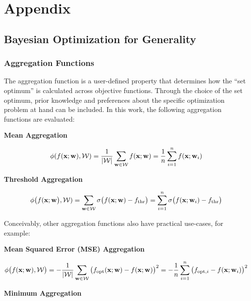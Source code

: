 \appendix
\onecolumn

\section{Appendix}

\subsection{Bayesian Optimization for Generality}

\subsubsection{Aggregation Functions} \label{subsubsec: Aggregation_functions}

The aggregation function is a user-defined property that determines how the ``set optimum'' is calculated across objective functions. 
Through the choice of the set optimum, prior knowledge and preferences about the specific optimization problem at hand can be included. 
In this work, the following aggregation functions are evaluated:

\textbf{Mean Aggregation}

\begin{equation}
\phi(f({\mathbf{x}}; {\mathbf{w}}), \mathcal{W}) = \frac{1}{|\mathcal{W}|} \sum_{{\mathbf{w}} \in \mathcal{W}} f({\mathbf{x}}; {\mathbf{w}}) = \frac{1}{n} \sum_{i=1}^{n}f({\mathbf{x}}; {\mathbf{w}}_i)
\end{equation}

\textbf{Threshold Aggregation}

\begin{equation}
\phi\big(f({\mathbf{x}}; {\mathbf{w}}\big), \mathcal{W}) = \sum_{{\mathbf{w}} \in \mathcal{W}} \sigma\big(f({\mathbf{x}}; {\mathbf{w}}) - f_{\mathrm{thr}}\big) = \sum_{i=1}^{n} \sigma\big(f({\mathbf{x}}; {\mathbf{w}}_i) - f_{\mathrm{thr}}\big)
\end{equation}

Conceivably, other aggregation functions also have practical use-cases, for example:

\textbf{Mean Squared Error (MSE) Aggregation}

\begin{equation}
\phi\big(f({\mathbf{x}}; {\mathbf{w}}), \mathcal{W}\big)  = - \frac{1}{|\mathcal{W}|} \sum_{{\mathbf{w}} \in \mathcal{W}} \big(f_{\mathrm{opt}}({\mathbf{x}}; {\mathbf{w}}) - f({\mathbf{x}}; {\mathbf{w}})\big)^2 = - \frac{1}{n} \sum_{i=1}^n \big(f_{\mathrm{opt},i} - f({\mathbf{x}}; {\mathbf{w}}_i)\big)^2
\end{equation}

\textbf{Minimum Aggregation}

